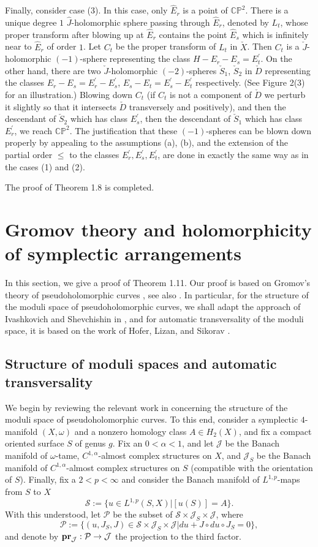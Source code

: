 \documentclass[11pt]{amsart}
\theoremstyle{plain}
\numberwithin{theorem}{section}
\theoremstyle{definition}
\newcommand{\C}{{\mathbb C}}
\renewcommand{\P}{{\mathbb P}}
\newcommand{\J}{{\mathcal J}}
\renewcommand{\S}{{\mathcal S}}
\newcommand{\p}{{\mathcal P}}
\begin{document}
Finally, consider case (3). In this case, only $\hat{E}_r$ is a point of $\C\P^2$. There is a unique degree 
$1$ $\hat{J}$-holomorphic sphere passing through $\hat{E}_r$, denoted by $L_t$, whose proper transform after blowing up at $\hat{E}_r$ contains the point $\hat{E}_s$ which is infinitely near to $\hat{E}_r$ of order $1$. Let $C_t$ be the proper transform of $L_t$ in $\check{X}$. Then $C_t$ is a $\check{J}$-holomorphic $(-1)$-sphere representing the class $H-E_r-E_s=E_t^\prime$. On the other hand, there are two $\check{J}$-holomorphic $(-2)$-spheres $\check{S}_1$, $\check{S}_2$ in $\check{D}$ representing the classes $E_r-E_s=E_r^\prime-E_s^\prime$,
$E_s-E_t=E_s^\prime-E_t^\prime$ respectively. (See Figure 2(3) for an illustration.) 
Blowing down $C_t$ (if $C_t$ is not a component of
$\check{D}$ we perturb it slightly so that it intersects $\check{D}$ transversely and positively), and
then the descendant of $\check{S}_2$ which has class $E_s^\prime$, then the descendant of $\check{S}_1$
which has class $E_r^\prime$, we reach $\C\P^2$. The justification that these $(-1)$-spheres can be blown down
properly by appealing to the assumptions (a), (b), and the extension of the partial order $\leq$ to the classes $E_r^\prime, E_s^\prime,E_t^\prime$, are done in exactly the same way as in the cases (1) and (2). 

The proof of Theorem 1.8 is completed. 


\section{Gromov theory and holomorphicity of symplectic arrangements}

In this section, we give a proof of Theorem 1.11. Our proof  is based on Gromov's theory of pseudoholomorphic curves \cite{G}, see also \cite{Bar, HLS, IvaS, Shev, ST}. In particular, for the structure of the moduli space of pseudoholomorphic curves, we shall adapt the approach of Ivashkovich and Shevchishin in \cite{IvaS}, and for automatic transversality of the moduli space, it is based on the work of Hofer, Lizan, and Sikorav \cite{HLS}. 

\subsection{Structure of moduli spaces and automatic transversality}
We begin by reviewing the relevant work in \cite{IvaS} concerning the structure of the moduli space of pseudoholomorphic curves. To this end, consider a symplectic $4$-manifold $(X,\omega)$ and a nonzero homology class $A\in H_2(X)$, and fix a compact oriented surface $S$ of genus $g$. Fix an
$0<\alpha<1$, and let $\J$ be the Banach manifold of $\omega$-tame, $C^{1,\alpha}$-almost complex structures on $X$, and $\J_S$ be the Banach manifold of $C^{1,\alpha}$-almost complex structures on $S$ (compatible with the orientation of $S$). Finally, fix a $2<p<\infty$ and consider the Banach
manifold of $L^{1,p}$-maps from $S$ to $X$
$$
\S:=\{u\in L^{1,p}(S,X)| [u(S)]=A\}. 
$$
With this understood, let $\p$ be the subset of $\S\times \J_S\times \J$, where
$$
\p:=\{(u,J_S,J)\in \S\times \J_S\times \J | du+J\circ du\circ J_S=0\},
$$
and denote by ${\bf pr}_\J: \p\rightarrow \J$ the projection to the third factor. 
\end{document}
